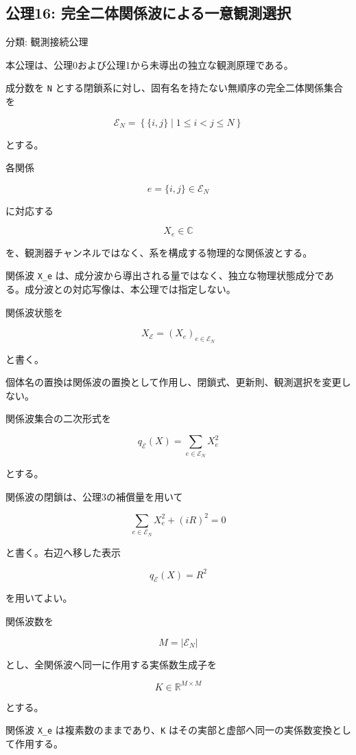 \documentclass[
  a4paper,
]{ltjsarticle}
\begin{document}
\subsection{公理16:
完全二体関係波による一意観測選択}\label{ux516cux740616-ux5b8cux5168ux4e8cux4f53ux95a2ux4fc2ux6ce2ux306bux3088ux308bux4e00ux610fux89b3ux6e2cux9078ux629e}

分類: 観測接続公理

本公理は、公理0および公理1から未導出の独立な観測原理である。

成分数を \texttt{N}
とする閉鎖系に対し、固有名を持たない無順序の完全二体関係集合を

\[
\mathcal E_N
=\left\{\{i,j\}\mid 1\le i<j\le N\right\}
\]

とする。

各関係

\[
e=\{i,j\}\in\mathcal E_N
\]

に対応する

\[
X_e\in\mathbb C
\]

を、観測器チャンネルではなく、系を構成する物理的な関係波とする。

関係波 \texttt{X\_e}
は、成分波から導出される量ではなく、独立な物理状態成分である。成分波との対応写像は、本公理では指定しない。

関係波状態を

\[
X_{\mathcal E}
=\left(X_e\right)_{e\in\mathcal E_N}
\]

と書く。

個体名の置換は関係波の置換として作用し、閉鎖式、更新則、観測選択を変更しない。

関係波集合の二次形式を

\[
q_{\mathcal E}(X)
=\sum_{e\in\mathcal E_N}X_e^2
\]

とする。

関係波の閉鎖は、公理3の補償量を用いて

\[
\sum_{e\in\mathcal E_N}X_e^2+(iR)^2=0
\]

と書く。右辺へ移した表示

\[
q_{\mathcal E}(X)=R^2
\]

を用いてよい。

関係波数を

\[
M=\left|\mathcal E_N\right|
\]

とし、全関係波へ同一に作用する実係数生成子を

\[
K\in\mathbb R^{M\times M}
\]

とする。

関係波 \texttt{X\_e} は複素数のままであり、\texttt{K}
はその実部と虚部へ同一の実係数変換として作用する。
\end{document}
